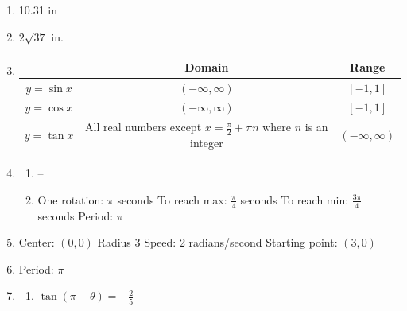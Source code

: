 \documentclass{article}
\begin{document}
\begin{enumerate}
\begin{enumerate}
	\item $z = h\cos{^3(B)}$
	
	\end{enumerate}
	
\item 10.31 in

\item $2\sqrt{37}$ in.

\item

	\begin{tabular}{| c | c | c |}
	
	\hline
	& Domain & Range \\
	\hline
	$y = \sin{x}$ & $(-\infty, \infty)$ & $[-1,1]$ \\
	\hline
	$y = \cos{x}$ & $(-\infty, \infty)$ & $[-1, 1]$ \\
	\hline
	$y = \tan{x}$ & All real numbers except $x = \frac{\pi}{2} + \pi n$ where $n$ is an integer & $(-\infty, \infty)$ \\
	\hline
	
	\end{tabular}
	
\item 

	\begin{enumerate}
	
	\item -- 
	
	\item One rotation: $\pi$ seconds \newline
		To reach max: $\frac{\pi}{4}$ seconds \newline
		To reach min: $\frac{3\pi}{4}$ seconds \newline
		Period: $\pi$
	
	\end{enumerate}

\item Center: $(0,0)$ \newline
	Radius $3$ \newline
	Speed: 2 radians/second \newline
	Starting point: $(3,0)$

\item Period: $\pi$

\item
	
	\begin{enumerate}
	
	\item $\tan{(\pi - \theta)} = -\frac{2}{5}$
	

\end{enumerate}
\end{enumerate}
\end{document}
